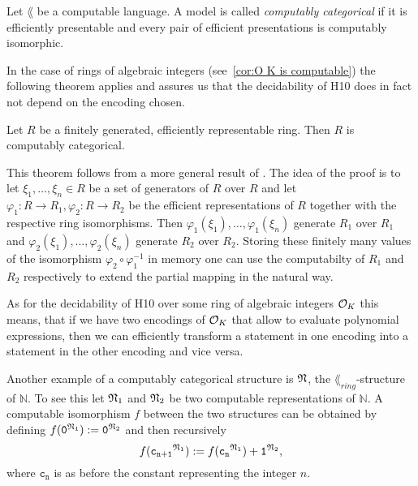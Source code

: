 \begin{defin}
  Let \(\lang\) be a computable language. A model is called \emph{computably
  categorical} if it is efficiently presentable and every pair of efficient
  presentations is computably isomorphic.
\end{defin}

In the case of rings of algebraic integers (see~\cref{cor:O K is computable})
the following theorem applies and assures us that the decidability of
\textsc{H10} does in fact not depend on the encoding chosen.

\begin{thm}\label{thm:computable categoricity}
  Let \(R\) be a finitely generated, efficiently representable ring. Then \(R\)
  is computably categorical.
\end{thm}

This theorem follows from a more general result of \textcite{Malcev1961}. The
idea of the proof is to let \(ξ_1, …, ξ_n ∈ R\) be a set of generators of \(R\)
over \(R\) and let \(φ_1: R → R_1, φ_2: R → R_2\) be the efficient
representations of \(R\) together with the respective ring isomorphisms. Then
\(φ_1(ξ_1), …, φ_1(ξ_n)\) generate \(R_1\) over \(R_1\) and \(φ_2(ξ_1), …,
φ_2(ξ_n)\) generate \(R_2\) over \(R_2\). Storing these finitely many values of
the isomorphism \(φ_2 \circ φ_1^{-1}\) in memory one can use the computabilty of
\(R_1\) and \(R_2\) respectively to extend the partial mapping in the natural
way.

As for the decidability of \textsc{H10} over some ring of algebraic integers
\(\mathcal{O}_{K}\) this means, that if we have two encodings of \(\mathcal{O}_{K}\) that allow
to evaluate polynomial expressions, then we can efficiently transform a
statement in one encoding into a statement in the other encoding and vice versa.

\begin{exam}\label{ex:N is computably categorical}
  Another example of a computably categorical structure is \(\mathfrak{N}\), the
  \(\lang_{ring}\)-structure of \(ℕ\). To see this let \(\mathfrak{N}_1\) and
  \(\mathfrak{N}_2\) be two computable representations of \(ℕ\). A computable
  isomorphism \(f\) between the two structures can be obtained by defining
  \(f(\mathtt{0}^{\mathfrak{N}_1}) := \mathtt{0}^{\mathfrak{N}_2}\) and then
  recursively
  \[
    f(\mathtt{c_{n + 1}}^{\mathfrak{N}_1}) := f(\mathtt{c_n}^{\mathfrak{N}_1}) +
    \mathtt{1}^{\mathfrak{N}_2},
  \]
  where \(\mathtt{c_{n}}\) is as before the constant representing the integer
  \(n\).
\end{exam}

